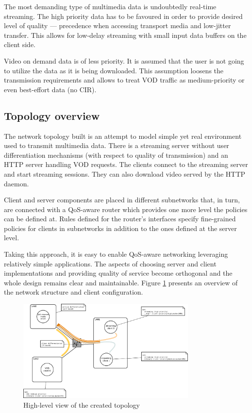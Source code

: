 \documentclass[11pt]{book}
\begin{document}
        The most demanding type of multimedia data is undoubtedly real-time streaming. The high priority data has to be
        favoured in order to provide desired level of quality --- precedence when accessing transport media and
        low-jitter transfer. This allows for low-delay streaming with small input data buffers on the client side.

        Video on demand data is of less priority. It is assumed that the user is not going to utilize the data as it is
        being downloaded. This assumption loosens the transmission requirements and allows to treat VOD traffic as
        medium-priority or even best-effort data (no CIR).


      \subsection{Topology overview}

        The network topology built is an attempt to model simple yet real environment used to transmit multimedia data.
        There is a streaming server without user differentiation mechanisms (with respect to quality of transmission)
        and an HTTP server handling VOD requests. The clients connect to the streaming server and start streaming
        sessions. They can also download video served by the HTTP daemon.

        Client and server components are placed in different subnetworks that, in turn, are connected with a QoS-aware
        router which provides one more level the policies can be defined at. Rules defined for the router's interfaces
        specify fine-grained policies for clients in subnetworks in addition to the ones defined at the server level.

        Taking this approach, it is easy to enable QoS-aware networking leveraging relatively simple applications. The
        aspects of choosing server and client implementations and providing quality of service become orthogonal and the
        whole design remains clear and maintainable. Figure \ref{fig:cs:scenario} presents an overview of the network
        structure and client configuration.
      
        \begin{figure}[H]
          \begin{center}
            \includegraphics[width=0.8\textwidth]{img/test-case/diagram.pdf}
          \end{center}

          \caption{High-level view of the created topology}
          \label{fig:cs:scenario}
        \end{figure}
      
\end{document}
